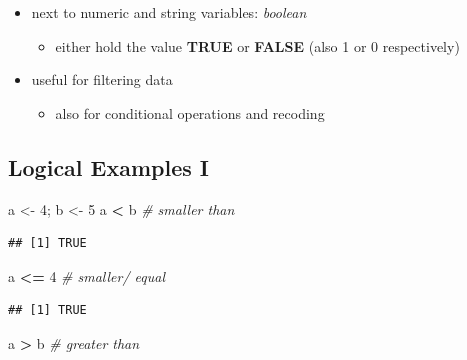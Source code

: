 \documentclass[
]{book}
\newenvironment{Shaded}{\begin{snugshade}}{\end{snugshade}}
\newcommand{\CommentTok}[1]{\textcolor[rgb]{0.56,0.35,0.01}{\textit{#1}}}
\newcommand{\DecValTok}[1]{\textcolor[rgb]{0.00,0.00,0.81}{#1}}
\newcommand{\NormalTok}[1]{#1}
\newcommand{\OtherTok}[1]{\textcolor[rgb]{0.56,0.35,0.01}{#1}}
\newcommand{\SpecialCharTok}[1]{\textcolor[rgb]{0.81,0.36,0.00}{\textbf{#1}}}
\providecommand{\tightlist}{%
  \setlength{\itemsep}{0pt}\setlength{\parskip}{0pt}}
\begin{document}
\begin{itemize}
\tightlist
\item
  next to numeric and string variables: \emph{boolean}

  \begin{itemize}
  \tightlist
  \item
    either hold the value \textbf{TRUE} or \textbf{FALSE} (also 1 or 0 respectively)
  \end{itemize}
\item
  useful for filtering data

  \begin{itemize}
  \tightlist
  \item
    also for conditional operations and recoding
  \end{itemize}
\end{itemize}

\subsection{Logical Examples I}\label{logical-examples-i}

\begin{Shaded}
\begin{Highlighting}[]
\NormalTok{a }\OtherTok{\textless{}{-}} \DecValTok{4}\NormalTok{; b }\OtherTok{\textless{}{-}} \DecValTok{5}
\NormalTok{a }\SpecialCharTok{\textless{}}\NormalTok{ b }\CommentTok{\# smaller than}
\end{Highlighting}
\end{Shaded}

\begin{verbatim}
## [1] TRUE
\end{verbatim}

\begin{Shaded}
\begin{Highlighting}[]
\NormalTok{a }\SpecialCharTok{\textless{}=} \DecValTok{4} \CommentTok{\# smaller/ equal}
\end{Highlighting}
\end{Shaded}

\begin{verbatim}
## [1] TRUE
\end{verbatim}

\begin{Shaded}
\begin{Highlighting}[]
\NormalTok{a }\SpecialCharTok{\textgreater{}}\NormalTok{ b }\CommentTok{\# greater than}
\end{Highlighting}
\end{Shaded}
\end{document}
